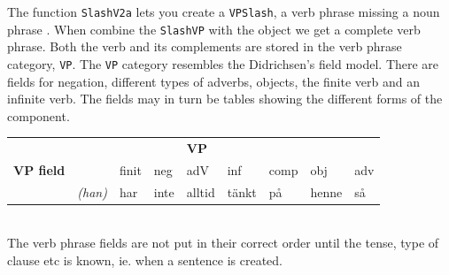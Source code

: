 \documentclass{report}
\begin{document}
The function \verb-SlashV2a- lets you create a \verb-VPSlash-, a verb phrase missing a
noun phrase \cite{gazdar}. When combine the \verb-SlashVP- with the object we
get a complete verb phrase.
Both the verb and its complements are stored in the verb phrase category, \verb-VP-.
The \verb-VP- category resembles the Didrichsen's field model.
There are fields
for negation, different types of adverbs, objects, the finite verb and an infinite verb.
The fields may in turn be tables showing the different forms of the component.\\

\begin{tabular}{|l|llllllll|}
\hline
& & &&\textbf{VP}& & & & \\
\textbf{VP field} && \sc finit& \sc neg& \sc adV & \sc inf& \sc comp& \sc obj& \sc adv \\
\hline
&\emph{(han)} & har &  inte&  alltid&  tänkt&  på&  henne&  så \\
\hline
\end{tabular}\\

\vspace{5mm}
The verb phrase fields are not put in their correct order until the tense, type of clause etc is
known, ie. when a sentence is created.\\
\end{document}
